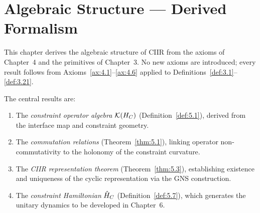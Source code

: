 %
%
%
%

%
%

\section{Algebraic Structure — Derived Formalism}
\label{sec:ch5:algebra}

This chapter derives the algebraic structure of CIIR from the axioms of
Chapter~4 and the primitives of Chapter~3.  No new axioms are
introduced; every result follows from
Axioms~\ref{ax:4.1}--\ref{ax:4.6} applied to
Definitions~\ref{def:3.1}--\ref{def:3.21}.

The central results are:
\begin{enumerate}
  \item The \emph{constraint operator algebra} $\mathcal{K}(H_C)$
    (Definition~\ref{def:5.1}), derived from the interface map and
    constraint geometry.
  \item The \emph{commutation relations}
    (Theorem~\ref{thm:5.1}), linking operator non-commutativity to
    the holonomy of the constraint curvature.
  \item The \emph{CIIR representation theorem}
    (Theorem~\ref{thm:5.3}), establishing existence and uniqueness of
    the cyclic representation via the GNS construction.
  \item The \emph{constraint Hamiltonian} $\hat{H}_C$
    (Definition~\ref{def:5.7}), which generates the unitary dynamics
    to be developed in Chapter~6.
\end{enumerate}

